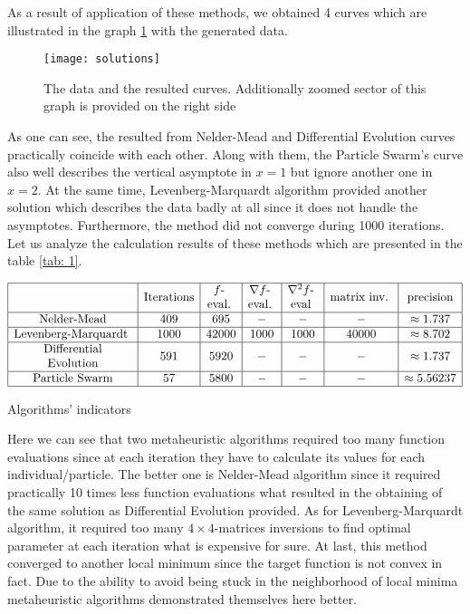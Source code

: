 \documentclass[12pt, bachelor, substylefile = algo_title.rtx]{disser}
\makeatletter
\newcommand{\specialcell}[2][c]{%
  \begin{tabular}[#1]{@{}c@{}}#2\end{tabular}}
\theoremstyle{definition}
\makeatother
\begin{document}
As a result of application of these methods, we obtained 4 curves which are illustrated in the graph \ref{fig: 1} with the generated data.

\begin{figure}[h]
\begin{center}
\texttt{[image: solutions]}
\caption{The data and the resulted curves. Additionally zoomed sector of this graph is provided on the right side}
\label{fig: 1}
\end{center}
\end{figure}
 
As one can see, the resulted from Nelder-Mead and Differential Evolution curves practically coincide with each other. Along with them, the Particle Swarm's curve also well describes the vertical asymptote in $x = 1$ but ignore another one in $x = 2$. At the same time, Levenberg-Marquardt algorithm provided another solution which describes the data badly at all since it does not handle the asymptotes. Furthermore, the method did not converge during 1000 iterations.
Let us analyze the calculation results of these methods which are presented in the table 
\ref{tab: 1}.


\begin{table}[h]
$$
\begin{array}{|c|c|c|c|c|c|c|}
\hline
 & \text{Iterations} & \text{\specialcell{ $f$-\\eval.} }& \text{\specialcell{ $\nabla f$-\\eval.} } & \text{\specialcell{ $\nabla^2 f$-\\eval} } & \text{\specialcell{ matrix inv. } } &\text{precision}\\
\hline
\text{Nelder-Mead} & 409 & 695 & - & - & - & \approx 1.737 \\ 
\hline
\text{\specialcell{ Levenberg-Marquardt } } & 1000 & 42000 & 1000 & 1000 & 40000 &\approx 8.702 \\
\hline
\text{\specialcell{Differential\\ Evolution}} & 591 & 5920 & - & - & - & \approx 1.737 \\
\hline
\text{Particle Swarm} & 57 & 5800 & - & - & - & \approx 5.56237 \\
\hline
\end{array}
$$
\caption{Algorithms' indicators}
\label{tab: 1}
\end{table}

Here we can see that two metaheuristic algorithms required too many function evaluations since at each iteration they have to calculate its values for each individual/particle. The better one is Nelder-Mead algorithm since it required practically 10 times less function evaluations what resulted in the obtaining of the same solution as Differential Evolution provided. As for Levenberg-Marquardt algorithm, it required too many $4 \times 4$-matrices inversions to find optimal parameter at each iteration what is expensive for sure. At last, this method converged to another local minimum since the target function is not convex in fact. Due to the ability to avoid being stuck in the neighborhood of local minima metaheuristic algorithms demonstrated themselves here better.
\end{document}
